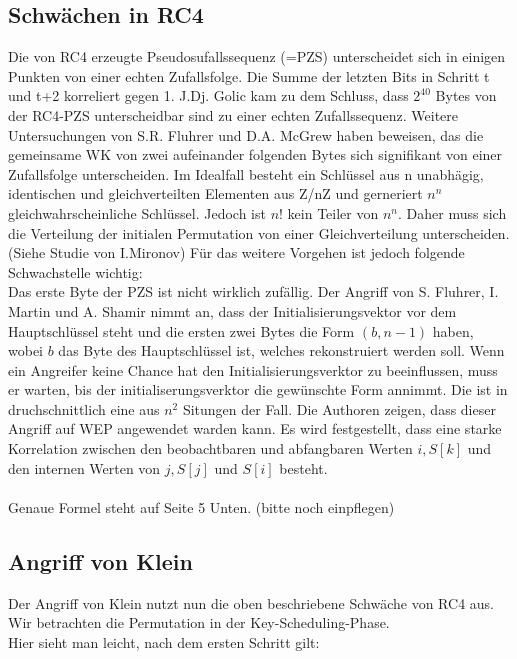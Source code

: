 \documentclass[10pt,a4paper]{article}
\begin{document}
\subsection{Schwächen in RC4}
Die von RC4 erzeugte Pseudosufallssequenz (=PZS) unterscheidet sich in einigen Punkten von einer echten Zufallsfolge. Die Summe der letzten Bits in Schritt t und t+2 korreliert gegen 1.
J.Dj. Golic kam zu dem Schluss, dass $2^40$ Bytes von der RC4-PZS unterscheidbar sind zu einer echten Zufallssequenz.
Weitere Untersuchungen von S.R. Fluhrer und D.A. McGrew haben beweisen, das die gemeinsame WK von zwei aufeinander folgenden Bytes sich signifikant von einer Zufallsfolge unterscheiden. Im Idealfall besteht ein Schlüssel aus n unabhägig, identischen und gleichverteilten Elementen aus Z/nZ und gerneriert $n^n$ gleichwahrscheinliche Schlüssel. Jedoch ist $n!$ kein Teiler von $n^n$. Daher muss sich die Verteilung der initialen Permutation von einer Gleichverteilung unterscheiden. (Siehe Studie von I.Mironov)
Für das weitere Vorgehen ist jedoch folgende Schwachstelle wichtig:\\
Das erste Byte der PZS ist nicht wirklich zufällig. Der Angriff von S. Fluhrer, I. Martin und A. Shamir nimmt an, dass der Initialisierungsvektor vor dem Hauptschlüssel steht und die ersten zwei Bytes die Form $(b,n-1)$ haben, wobei $b$ das Byte des Hauptschlüssel ist, welches rekonstruiert werden soll. Wenn ein Angreifer keine Chance hat den Initialisierungsverktor zu beeinflussen, muss er warten, bis der initialiserungsverktor die gewünschte Form annimmt. Die ist in druchschnittlich eine aus $n^2$ Situngen der Fall. Die Authoren zeigen, dass dieser Angriff auf WEP angewendet warden kann.
Es wird festgestellt, dass eine starke Korrelation zwischen den beobachtbaren und abfangbaren Werten $i, S[k]$ und den internen Werten von $j, S[j]$ und $S[i]$ besteht.
\\\\
Genaue Formel steht auf Seite 5 Unten. (bitte noch einpflegen)

\subsection{Angriff von Klein}\label{ssec:klein}
Der Angriff von Klein nutzt nun die oben beschriebene Schwäche von RC4 aus. Wir betrachten die Permutation in der Key-Scheduling-Phase.\\
Hier sieht man leicht, nach dem ersten Schritt gilt:
\end{document}
